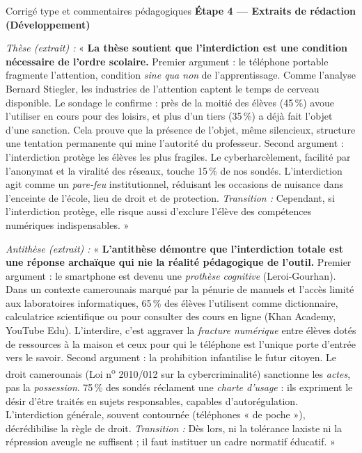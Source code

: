 \documentclass[11pt]{article}
\begin{document}
\begin{exoresolu}{Corrigé type et commentaires pédagogiques}
\textbf{Étape 4 — Extraits de rédaction (Développement)}

\textit{Thèse (extrait) :} « \textbf{La thèse soutient que l'interdiction est une condition nécessaire de l'ordre scolaire.} Premier argument : le téléphone portable fragmente l'attention, condition \emph{sine qua non} de l'apprentissage. Comme l'analyse Bernard Stiegler, les industries de l'attention captent le temps de cerveau disponible. Le sondage le confirme : près de la moitié des élèves (45\,\%) avoue l'utiliser en cours pour des loisirs, et plus d'un tiers (35\,\%) a déjà fait l'objet d'une sanction. Cela prouve que la présence de l'objet, même silencieux, structure une tentation permanente qui mine l'autorité du professeur. Second argument : l'interdiction protège les élèves les plus fragiles. Le cyberharcèlement, facilité par l'anonymat et la viralité des réseaux, touche 15\,\% de nos sondés. L'interdiction agit comme un \emph{pare-feu} institutionnel, réduisant les occasions de nuisance dans l'enceinte de l'école, lieu de droit et de protection. \textit{Transition :} Cependant, si l'interdiction protège, elle risque aussi d'exclure l'élève des compétences numériques indispensables. »

\textit{Antithèse (extrait) :} « \textbf{L'antithèse démontre que l'interdiction totale est une réponse archaïque qui nie la réalité pédagogique de l'outil.} Premier argument : le smartphone est devenu une \emph{prothèse cognitive} (Leroi-Gourhan). Dans un contexte camerounais marqué par la pénurie de manuels et l'accès limité aux laboratoires informatiques, 65\,\% des élèves l'utilisent comme dictionnaire, calculatrice scientifique ou pour consulter des cours en ligne (Khan Academy, YouTube Edu). L'interdire, c'est aggraver la \emph{fracture numérique} entre élèves dotés de ressources à la maison et ceux pour qui le téléphone est l'unique porte d'entrée vers le savoir. Second argument : la prohibition infantilise le futur citoyen. Le droit camerounais (Loi n\textsuperscript{o} 2010/012 sur la cybercriminalité) sanctionne les \emph{actes}, pas la \emph{possession}. 75\,\% des sondés réclament une \emph{charte d'usage} : ils expriment le désir d'être traités en sujets responsables, capables d'autorégulation. L'interdiction générale, souvent contournée (téléphones « de poche »), décrédibilise la règle de droit. \textit{Transition :} Dès lors, ni la tolérance laxiste ni la répression aveugle ne suffisent ; il faut instituer un cadre normatif éducatif. »


\end{exoresolu}
\end{document}
